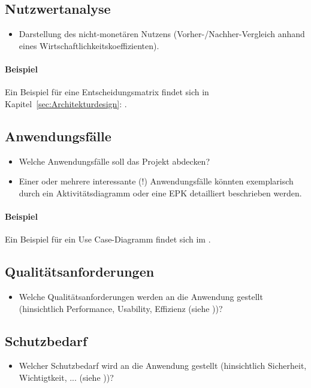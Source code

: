 \subsection{Nutzwertanalyse}
\label{sec:Nutzwertanalyse}
\begin{itemize}
	\item Darstellung des nicht-monetären Nutzens (\zB Vorher-/Nachher-Vergleich anhand eines Wirtschaftlichkeitskoeffizienten). 
\end{itemize}

\paragraph{Beispiel}
Ein Beispiel für eine Entscheidungsmatrix findet sich in Kapitel~\ref{sec:Architekturdesign}: .


\subsection{Anwendungsfälle}
\label{sec:Anwendungsfaelle}
\begin{itemize}
	\item Welche Anwendungsfälle soll das Projekt abdecken?
	\item Einer oder mehrere interessante (!) Anwendungsfälle könnten exemplarisch durch ein Aktivitätsdiagramm oder eine \ac{EPK} detailliert beschrieben werden. 
\end{itemize}

\paragraph{Beispiel}
Ein Beispiel für ein Use Case-Diagramm findet sich im .


\subsection{Qualitätsanforderungen}
\label{sec:Qualitaetsanforderungen}
\begin{itemize}
	\item Welche Qualitätsanforderungen werden an die Anwendung gestellt (\zB hinsichtlich Performance, Usability, Effizienz \etc (siehe \citet{ISO9126}))?
\end{itemize}

\subsection{Schutzbedarf}
\label{sec:Schutzbedarf}
\begin{itemize}
	\item Welcher Schutzbedarf  wird an die Anwendung gestellt (\zB hinsichtlich Sicherheit, Wichtigtkeit, ... \etc (siehe \citet{BSI-S-200-2}))?
\end{itemize}

